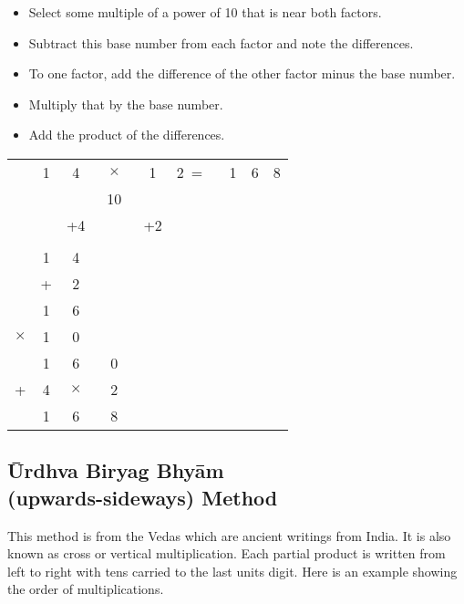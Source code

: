 \documentclass{article}
\begin{document}
\begin{spacing}{1.25}
\begin{itemize}
\item Select some multiple of a power of 10 that is near both factors.
\item Subtract this base number from each factor and note the differences.
\item To one factor, add the difference of the other factor minus the base number.
\item Multiply that by the base number.
\item Add the product of the differences.
\end{itemize}

\begin{tabular}{c@{\,}c@{\,}c@{\,}c@{\,}c@{\,}c@{\,}c@{\,}c@{\,}c@{\,}}
        &1&4&$\times$&1&2\ = \ &1&6&8\\
        & & &\ 10\   & &       & & &\\
        & &+4&       &+2&      & & &\\\\
        & 1&4&&&&&&\\
        & +&2&&&&&&\\\cline{2-3}
        & 1&6&&&&&&\\
        $\times$&1&0&&&&&&\\\cline{2-4}
        & 1&6&0&&&&&\\
        +&4&$\times$&2&&&&&\\\cline{2-4}
        & 1&6&8&&&&&\\\cline{2-4}
\end{tabular}

\pagebreak

\subsection*{\=Urdhva Biryag Bhy\=am\\
(upwards-sideways) Method}

This method is from the Vedas which are ancient writings from India. It is also known as cross or vertical multiplication. Each partial product is written from left to right with tens carried to the last units digit. Here is an example showing the order of multiplications.\\


\end{spacing}
\end{document}
